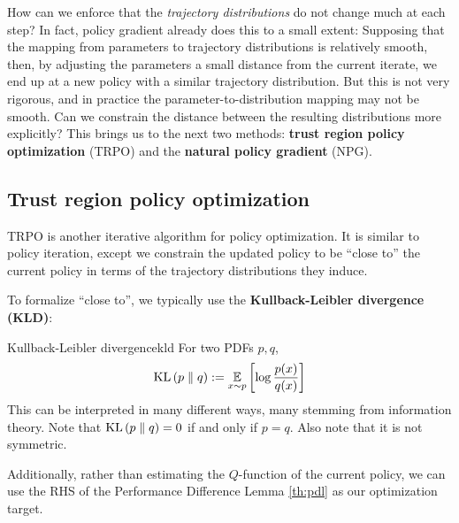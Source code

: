 \documentclass[\main/main]{subfiles}
\begin{document}
How can we enforce that the \emph{trajectory distributions} do not change much at each step?
In fact, policy gradient already does this to a small extent: Supposing that the mapping from parameters to trajectory distributions is relatively smooth, then, by adjusting the parameters a small distance from the current iterate, we end up at a new policy with a similar trajectory distribution.
But this is not very rigorous, and in practice the parameter-to-distribution mapping may not be smooth. Can we constrain the distance between the resulting distributions more explicitly?
This brings us to the next two methods: \textbf{trust region policy optimization} (TRPO) and the \textbf{natural policy gradient} (NPG).

\subsection{Trust region policy optimization}

TRPO is another iterative algorithm for policy optimization. It is similar to policy iteration, except we constrain the updated policy to be ``close to'' the current policy in terms of the trajectory distributions they induce.

To formalize ``close to'', we typically use the \textbf{Kullback-Leibler divergence (KLD)}:

\begin{definition}{Kullback-Leibler divergence}{kld}
    For two PDFs $p, q$,
    \begin{equation}
        \mathrm{KL}\left(p \parallel q\right) := \operatorname*{\mathbb{E}}_{x \sim p} \left[ \log \frac{p(x)}{q(x)} \right]
    \end{equation}
    This can be interpreted in many different ways, many stemming from information theory.
    Note that $\mathrm{KL}\left(p \parallel q\right) = 0$ if and only if $p = q$. Also note that it is not symmetric.
\end{definition}



Additionally, rather than estimating the $Q$-function of the current policy, we can use the RHS of the Performance Difference Lemma \eqref{th:pdl} as our optimization target.
\end{document}
